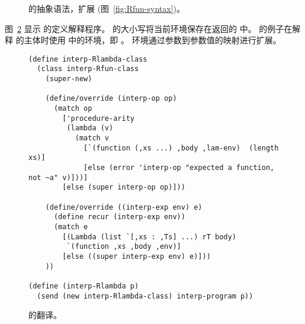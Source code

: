 \documentclass[11pt]{book}
\newcommand{\gray}[1]{{\color{gray} #1}}
\begin{document}
\begin{figure}[tp]
\centering
\fbox{
  \begin{minipage}{0.96\textwidth}
    \small
\[
\begin{array}{lcl}
  \itm{op} &::=& \ldots \mid \code{procedure-arity} \\
  \Exp &::=& \gray{ \INT{\Int} \VAR{\Var} \mid \LET{\Var}{\Exp}{\Exp} } \\
       &\mid& \gray{ \PRIM{\itm{op}}{\Exp\ldots} }\\
     &\mid& \gray{ \BOOL{\itm{bool}}
      \mid \IF{\Exp}{\Exp}{\Exp} } \\
     &\mid& \gray{ \VOID{} \mid \LP\key{HasType}~\Exp~\Type \RP 
     \mid \APPLY{\Exp}{\Exp\ldots} }\\
     &\mid& \LAMBDA{\LP\LS\Var\code{:}\Type\RS\ldots\RP}{\Type}{\Exp}\\
 \Def &::=& \gray{ \FUNDEF{\Var}{\LP\LS\Var \code{:} \Type\RS\ldots\RP}{\Type}{\code{'()}}{\Exp} }\\
  \LangLam{} &::=& \gray{ \PROGRAMDEFSEXP{\code{'()}}{\LP\Def\ldots\RP}{\Exp} }
\end{array}
\]
\end{minipage}
}
\caption{ \LangLam{} 的抽象语法，扩展 \LangFun{} (图~\ref{fig:Rfun-syntax})。}
\label{fig:Rlam-syntax}
\end{figure}

\label{sec:interp-Rlambda}

图~\ref{fig:interp-Rlambda} 显示
\LangLam{} 的定义解释程序。  的大小写将当前环境保存在返回的  中。  的例子在解释  的主体时使用  中的环境，即  。 
环境通过参数到参数值的映射进行扩展。

\begin{figure}[tbp]
\begin{lstlisting}
(define interp-Rlambda-class
  (class interp-Rfun-class
    (super-new)

    (define/override (interp-op op)
      (match op
        ['procedure-arity
         (lambda (v)
           (match v
             [`(function (,xs ...) ,body ,lam-env)  (length xs)]
             [else (error 'interp-op "expected a function, not ~a" v)]))]
        [else (super interp-op op)]))

    (define/override ((interp-exp env) e)
      (define recur (interp-exp env))
      (match e
        [(Lambda (list `[,xs : ,Ts] ...) rT body)
         `(function ,xs ,body ,env)]
        [else ((super interp-exp env) e)]))
    ))

(define (interp-Rlambda p)
  (send (new interp-Rlambda-class) interp-program p))
\end{lstlisting}
\caption{ \LangLam{} 的翻译。}
\label{fig:interp-Rlambda}
\end{figure}
\end{document}

